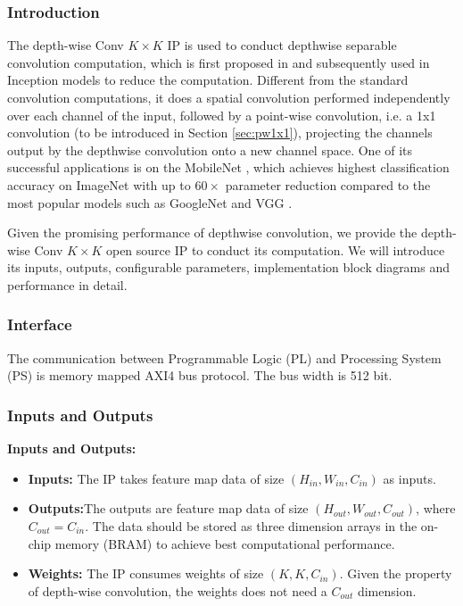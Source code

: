 \documentclass[a4paper, 11pt]{article}
\begin{document}
\subsubsection{Introduction}
The depth-wise Conv $K \times K$ IP is used to conduct depthwise separable convolution computation,
which is first proposed in \cite{r1} and subsequently used in Inception models \cite{r2} to reduce the computation.
Different from the standard convolution computations,
it does a spatial convolution performed independently over each channel of the input,
followed by a point-wise convolution, i.e. a 1x1 convolution (to be introduced in Section \ref{sec:pw1x1}),
projecting the channels output by the depthwise convolution onto a new channel space.
One of its successful applications is on the MobileNet \cite{r4}, 
which achieves highest classification accuracy on ImageNet with up to $60 \times$ parameter reduction compared to 
the most popular models such as GoogleNet \cite{r5} and VGG \cite{r6}.

Given the promising performance of depthwise convolution,
we provide the depth-wise Conv $K \times K$ open source IP to conduct its computation.
We will introduce its inputs, outputs, configurable parameters, implementation block diagrams and performance in detail.


\subsubsection{Interface}

The communication between Programmable Logic (PL) and Processing System (PS) is memory mapped AXI4 bus protocol. The bus width is 512 bit.



\subsubsection{Inputs and Outputs}

\textbf{Inputs and Outputs:}
 

    
    
    
\begin{itemize}
\item {
\textbf{Inputs:} The IP takes feature map data of size $(H_{in}, W_{in}, C_{in})$ as inputs.
}
\item {
\textbf{Outputs:}The outputs are feature map data of size $(H_{out}, W_{out}, C_{out})$,
where $C_{out} = C_{in}$.
The data should be stored as three dimension arrays
in the on-chip memory (BRAM) to achieve best computational performance.
}
\item {
\textbf{Weights:} The IP consumes weights of size $(K, K, C_{in})$.
Given the property of depth-wise convolution, the weights does not need a $C_{out}$ dimension.
}
\end{itemize}
\end{document}
